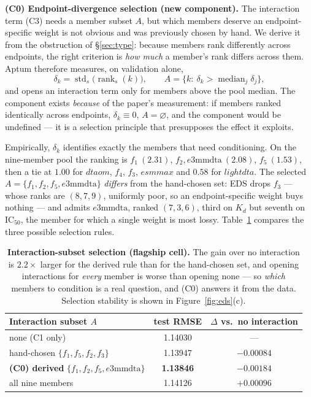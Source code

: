 \documentclass[10pt,letterpaper]{article}
\newcommand{\best}[1]{\ifmmode\mathbf{#1}\else\textbf{#1}\fi}
\begin{document}
\smallskip
\noindent\textbf{(C0) Endpoint-divergence selection (new component).} The interaction
term (C3) needs a member subset $A$, but which members deserve an endpoint-specific
weight is not obvious and was previously chosen by hand. We derive it from the
obstruction of \S\ref{sec:type}: because members rank differently across endpoints,
the right criterion is \emph{how much} a member's rank differs across them. Aptum
therefore measures, on validation alone,
\begin{equation}
\delta_k=\operatorname{std}_{s}\big(\operatorname{rank}_s(k)\big),
\qquad
A=\{k:\ \delta_k>\operatorname{median}_j \delta_j\},
\label{eq:c0}
\end{equation}
and opens an interaction term only for members above the pool median. The component
exists \emph{because} of the paper's measurement: if members ranked identically across
endpoints, $\delta_k\equiv 0$, $A=\varnothing$, and the component would be undefined ---
it is a selection principle that presupposes the effect it exploits.

Empirically, $\delta_k$ identifies exactly the members that need conditioning. On the
nine-member pool the ranking is $f_1\ (2.31)$, $f_2,e3\text{mmdta}\ (2.08)$,
$f_5\ (1.53)$, then a tie at $1.00$ for $dtaom$, $f_4$, $f_3$, $esmmax$ and $0.58$ for
$lightdta$. The selected $A=\{f_1,f_2,f_5,e3\text{mmdta}\}$ \emph{differs} from the
hand-chosen set: EDS drops $f_3$ --- whose ranks are $(8,7,9)$, uniformly poor, so an
endpoint-specific weight buys nothing --- and admits $e3\text{mmdta}$, ranked
$(7,3,6)$, third on $K_d$ but seventh on IC$_{50}$, the member for which a single
weight is most lossy. Table~\ref{tab:eds} compares the three possible selection rules.

\begin{table}[htbp]
\centering
\small
\caption{\textbf{Interaction-subset selection (flagship cell).} The gain over no
interaction is $2.2\times$ larger for the derived rule than for the hand-chosen set,
and opening interactions for \emph{every} member is worse than opening none --- so
\emph{which} members to condition is a real question, and (C0) answers it from the
data. Selection stability is shown in Figure~\ref{fig:eds}(c).}
\label{tab:eds}
\begin{tabular*}{\linewidth}{@{\extracolsep{\fill}}@{}lcc@{}}
\toprule
Interaction subset $A$ & test RMSE & $\Delta$ vs.\ no interaction \\
\midrule
none (C1 only)                 & 1.14030 & --- \\
hand-chosen $\{f_1,f_5,f_2,f_3\}$ & 1.13947 & $-0.00084$ \\
\textbf{(C0) derived} $\{f_1,f_2,f_5,e3\text{mmdta}\}$ & \best{1.13846} & \best{$-0.00184$} \\
all nine members               & 1.14126 & $+0.00096$ \\
\bottomrule
\end{tabular*}
\end{table}
\end{document}
